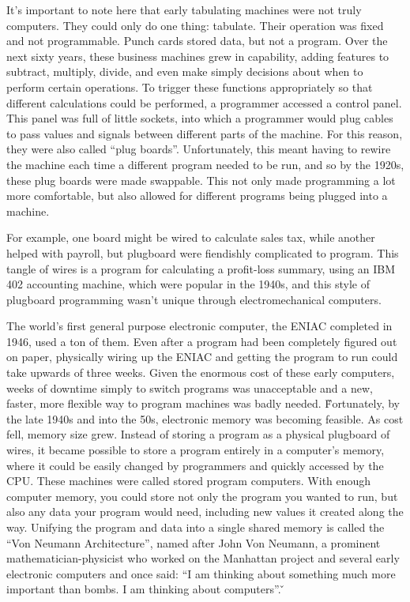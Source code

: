 It's important to note here that early tabulating machines were not truly computers. They could only do one thing:
tabulate. Their operation was fixed and not programmable. Punch cards stored data, but not a program. Over the next
sixty years, these business machines grew in capability, adding features to subtract, multiply, divide, and even make
simply decisions about when to perform certain operations. To trigger these functions appropriately so that different
calculations could be performed, a programmer accessed a control panel. This panel was full of little sockets, into
which a programmer would plug cables to pass values and signals between different parts of the machine. For this
reason, they were also called ``plug boards''. Unfortunately, this meant having to rewire the machine each time a
different program needed to be run, and so by the 1920s, these plug boards were made swappable. This not only made
programming a lot more comfortable, but also allowed for different programs being plugged into a machine.

\be
For example, one board might be wired to calculate sales tax, while another helped with payroll, but plugboard were
fiendishly complicated to program. This tangle of wires is a program for calculating a profit-loss summary, using an
IBM 402 accounting machine, which were popular in the 1940s, and this style of plugboard programming wasn't unique
through electromechanical computers.
\ee

The world's first general purpose electronic computer, the ENIAC completed in 1946, used a ton of them. Even after a
program had been completely figured out on paper, physically wiring up the ENIAC and getting the program to run could
take upwards of three weeks. Given the enormous cost of these early computers, weeks of downtime simply to switch
programs was unacceptable and a new, faster, more flexible way to program machines was badly needed. \v

Fortunately, by the late 1940s and into the 50s, electronic memory was becoming feasible. As cost fell, memory size
grew. Instead of storing a program as a physical plugboard of wires, it became possible to store a program entirely
in a computer's memory, where it could be easily changed by programmers and quickly accessed by the CPU. These
machines were called stored program computers. With enough computer memory, you could store not only the program you
wanted to run, but also any data your program would need, including new values it created along the way. Unifying the
program and data into a single shared memory is called the ``Von Neumann Architecture'', named after John Von
Neumann, a prominent mathematician-physicist who worked on the Manhattan project and several early electronic
computers and once said: ``I am thinking about something much more important than bombs. I am thinking about
computers''. \v

